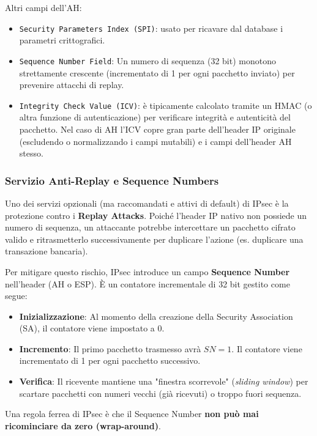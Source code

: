\documentclass[a4paper, 11pt]{article}
\begin{document}
Altri campi dell'AH:
\begin{itemize}
    \item \texttt{Security Parameters Index (SPI)}: usato per ricavare dal database i parametri crittografici.
    \item \texttt{Sequence Number Field}: Un numero di sequenza (32 bit) monotono strettamente crescente (incrementato di 1 per ogni pacchetto inviato) per prevenire attacchi di replay.
    \item \texttt{Integrity Check Value (ICV)}: è tipicamente calcolato tramite un HMAC (o altra funzione di autenticazione) per verificare integrità e autenticità del pacchetto. Nel caso di AH l'ICV copre gran parte dell'header IP originale (escludendo o normalizzando i campi mutabili) e i campi dell'header AH stesso. 
\end{itemize}

\subsubsection{Servizio Anti-Replay e Sequence Numbers}

Uno dei servizi opzionali (ma raccomandati e attivi di default) di IPsec è la protezione contro i \textbf{Replay Attacks}. Poiché l'header IP nativo non possiede un numero di sequenza, un attaccante potrebbe intercettare un pacchetto cifrato valido e ritrasmetterlo successivamente per duplicare l'azione (es. duplicare una transazione bancaria).

Per mitigare questo rischio, IPsec introduce un campo \textbf{Sequence Number} nell'header (AH o ESP). È un contatore incrementale di 32 bit gestito come segue:

\begin{itemize}
    \item \textbf{Inizializzazione}: Al momento della creazione della Security Association (SA), il contatore viene impostato a 0.
    \item \textbf{Incremento}: Il primo pacchetto trasmesso avrà $SN=1$. Il contatore viene incrementato di 1 per ogni pacchetto successivo.
    \item \textbf{Verifica}: Il ricevente mantiene una "finestra scorrevole" (\textit{sliding window}) per scartare pacchetti con numeri vecchi (già ricevuti) o troppo fuori sequenza.
\end{itemize}

Una regola ferrea di IPsec è che il Sequence Number \textbf{non può mai ricominciare da zero (wrap-around)}.
\end{document}
